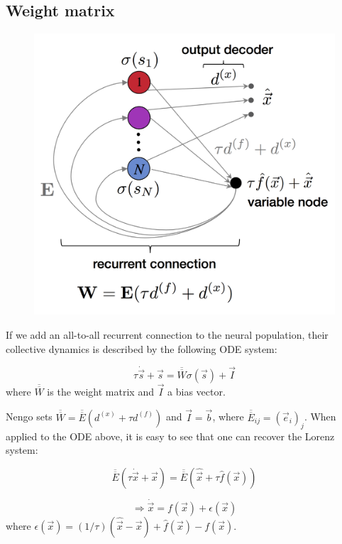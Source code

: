 \documentclass{report}
\makeatletter
\def\maxwidth{\ifdim\Gin@nat@width>\linewidth\linewidth
    \else\Gin@nat@width\fi}
\let\Oldincludegraphics\includegraphics
\renewcommand{\includegraphics}[1]{\Oldincludegraphics[width=.8\maxwidth]{#1}}
\makeatother
\begin{document}
\subsection{Weight matrix}\label{weight-matrix}

\begin{figure}
\centering
\includegraphics{Fig2.png}
\caption{}
\end{figure}

If we add an all-to-all recurrent connection to the neural population,
their collective dynamics is described by the following ODE system:

\[ \tau  \dot{\vec s} + \vec s =\overline{\overline{W}} \sigma(\vec s) + \vec I \]
where \(\overline{\overline{W}}\) is the weight matrix and \(\vec I\) a
bias vector.

Nengo sets
\(\overline{\overline{W}} = \overline{\overline{E}} (d^{(x)} + \tau d^{(f)})\)
and \(\vec I = \vec b\), where
\(\overline{\overline{E}}_{ij} = (\vec e_i)_j\). When applied to the ODE
above, it is easy to see that one can recover the Lorenz system:

\[ 
\overline{\overline{E}} (\tau  \dot{\vec x} + \vec x) = \overline{\overline{E}} (\hat{\vec x} + \tau \hat{f}(\vec x))
\]

\[ 
\Longrightarrow \dot{\vec x} = f(\vec x) + \epsilon(\vec x)
\] where
\(\epsilon(\vec x) = (1/\tau) (\hat{\vec x} - \vec x) + \hat{f}(\vec x) - f(\vec x)\).
\end{document}
